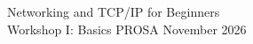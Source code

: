 \documentclass[Screen16to9,17pt]{foils}
\begin{document}



%


%
%
%
%
%
%

\mytitlepage
{Networking and TCP/IP for Beginners\\\vskip 1mm Workshop I: Basics}
{PROSA November 2026}

\hlkprofiluk
\end{document}
